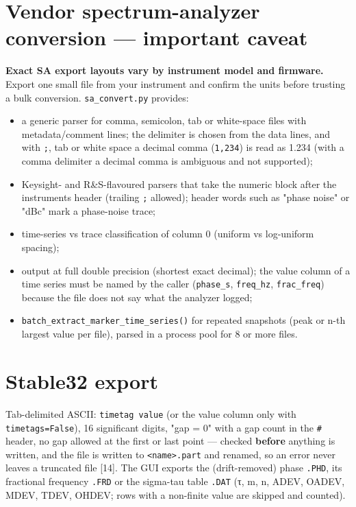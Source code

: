 \documentclass[10pt,a4paper]{article}
\providecommand{\tightlist}{\setlength{\itemsep}{0pt}\setlength{\parskip}{0pt}}
\begin{document}

\hypertarget{vendor-spectrum-analyzer-conversion--important-caveat}{%
\section{Vendor spectrum-analyzer conversion --- important caveat}\label{vendor-spectrum-analyzer-conversion--important-caveat}}

\textbf{Exact SA export layouts vary by instrument model and firmware.} Export one
small file from your instrument and confirm the units before trusting a bulk
conversion. \texttt{sa\_\allowbreak{}convert.py} provides:

\begin{itemize}
\tightlist
\item
  a generic parser for comma, semicolon, tab or white-space files with
  metadata/comment lines; the delimiter is chosen from the data lines, and
  with \texttt{;}, tab or white space a decimal comma (\texttt{1,\allowbreak{}234}) is read as 1.234
  (with a comma delimiter a decimal comma is ambiguous and not supported);
\item
  Keysight- and R\&S-flavoured parsers that take the numeric block after the
  instrument\textquotesingle s header (trailing \texttt{;} allowed); header words such as
  "phase noise" or "dBc" mark a phase-noise trace;
\item
  time-series vs trace classification of column 0 (uniform vs log-uniform
  spacing);
\item
  output at full double precision (shortest exact decimal); the value column
  of a time series must be named by the caller (\texttt{phase\_\allowbreak{}s}, \texttt{freq\_\allowbreak{}hz},
  \texttt{frac\_\allowbreak{}freq}) because the file does not say what the analyzer logged;
\item
  \texttt{batch\_\allowbreak{}extract\_\allowbreak{}marker\_\allowbreak{}time\_\allowbreak{}series()} for repeated snapshots (peak or
  n-th largest value per file), parsed in a process pool for 8 or more files.
\end{itemize}


\hypertarget{stable32-export}{%
\section{Stable32 export}\label{stable32-export}}

Tab-delimited ASCII: \texttt{timetag  value} (or the value column only with
\texttt{timetags=\allowbreak{}False}), 16 significant digits, "gap = 0" with a gap count in the
\texttt{\#} header, no gap allowed at the first or last point --- checked \textbf{before}
anything is written, and the file is written to \texttt{<name>.part} and renamed, so
an error never leaves a truncated file {[}14{]}. The GUI exports the
(drift-removed) phase \texttt{.PHD}, its fractional frequency \texttt{.FRD} or the
sigma-tau table \texttt{.DAT} (τ, m, n, ADEV, OADEV, MDEV, TDEV, OHDEV; rows with a
non-finite value are skipped and counted).
\end{document}
